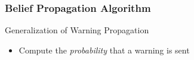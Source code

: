 \begin{frame}
	\frametitle{Belief Propagation Algorithm}
	Generalization of Warning Propagation
	\begin{itemize}
		\item Compute the \emph{probability} that a warning is sent
	\end{itemize}

		
\end{frame}